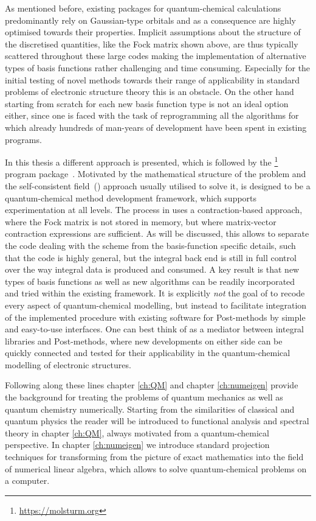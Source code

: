 As mentioned before, existing packages for quantum-chemical calculations
predominantly rely on Gaussian-type orbitals
and as a consequence are highly optimised towards their properties.
Implicit assumptions
about the structure of the discretised quantities,
like the Fock matrix shown above,
are thus typically scattered throughout these large codes
making the implementation of alternative types of basis functions
rather challenging and time consuming.
Especially for the initial testing of novel methods
towards their range of applicability
in standard problems of electronic structure theory
this is an obstacle.
On the other hand starting from scratch for each new basis function type
is not an ideal option either,
since one is faced with the task of reprogramming all the algorithms for which
already hundreds of man-years of development have been spent in existing programs.

In this thesis a different approach is presented,
which is followed by the \molsturm%
\footnote{\url{https://molsturm.org}}
program package~\cite{molsturmWeb}.
Motivated by the mathematical structure of the \HF problem
and the self-consistent field~(\SCF) approach usually utilised
to solve it, \molsturm is designed
to be a quantum-chemical method development framework,
which supports experimentation at all levels.
The \SCF process in \molsturm uses a contraction-based approach,
where the Fock matrix is not stored in memory,
but where matrix-vector contraction expressions are sufficient.
As will be discussed, this allows to separate the code dealing with the \SCF scheme
from the basis-function specific details,
such that the \SCF code is highly general,
but the integral back end is still in full control
over the way integral data is produced and consumed.
A key result is that new types of basis functions
as well as new \SCF algorithms can be readily incorporated
and tried within the existing framework.
It is explicitly \emph{not} the goal of \molsturm to recode
every aspect of quantum-chemical modelling,
but instead to facilitate integration
of the implemented \SCF procedure
with existing software for Post-\HF methods
by simple and easy-to-use interfaces.
One can best think of \molsturm as a mediator
between integral libraries and Post-\HF methods,
where new developments on either side
can be quickly connected and tested for their applicability
in the quantum-chemical modelling of electronic structures.

Following along these lines chapter
\ref{ch:QM} and chapter \ref{ch:numeigen}
provide the background for treating the problems of quantum mechanics
as well as quantum chemistry numerically.
Starting from the similarities of classical and quantum physics
the reader will be introduced to functional analysis
and spectral theory in chapter \ref{ch:QM},
always motivated from a quantum-chemical perspective.
In chapter \ref{ch:numeigen} we introduce standard projection techniques
for transforming from the picture of exact mathematics
into the field of numerical linear algebra,
which allows to solve quantum-chemical problems on a computer.

